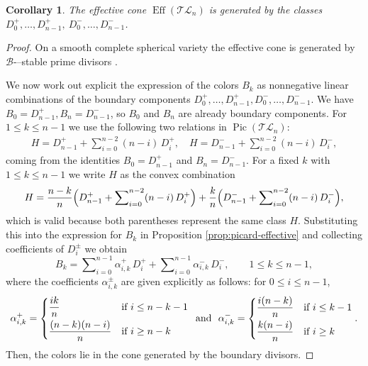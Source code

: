 \documentclass[10pt]{amsart}
\newtheorem{corollary}[theorem]{Corollary}
\theoremstyle{definition}
\newcommand{\Pic}{\operatorname{Pic}}
\newcommand{\Eff}{\operatorname{Eff}}
\newcommand{\TL}{\mathcal{TL}}
\theoremstyle{plain} %
\begin{document}
\begin{corollary}\label{effcone}
The effective cone $\Eff(\TL_n)$ is generated by the classes $D_0^+,\dots,D_{n-1}^+,\ D_0^-,\dots,D_{n-1}^-$.
\end{corollary}
\begin{proof}
On a smooth complete spherical variety the effective cone is generated by
$\mathscr{B}$-–stable prime divisors \cite[Section 2.6]{Br2}. 


We now work out explicit the expression of the colors $B_k$ as nonnegative
linear combinations of the boundary components $D_0^+,\dots,D_{n-1}^+, D_0^-,\dots,D_{n-1}^-$.
We have $B_0=D_{n-1}^+, B_n=D_{n-1}^-$, so $B_0$ and $B_n$ are already boundary components. For
$1\le k\le n-1$ we use the following two relations in $\Pic(\TL_n)$:
\begin{align*}
H=D_{n-1}^+ + \sum\nolimits_{i=0}^{n-2}(n-i)\,D_i^+,\quad
H=D_{n-1}^- + \sum\nolimits_{i=0}^{n-2}(n-i)\,D_i^-,
\end{align*}
coming from the identities $B_0=D_{n-1}^+$ and $B_n=D_{n-1}^-$. For a fixed $k$ with $1\le k\le n-1$ we write $H$ as the convex
combination
\[
H=\frac{n-k}{n}
   \Bigl(D_{n-1}^+ + \sum\nolimits_{i=0}^{n-2}(n-i)\,D_i^+\Bigr)
 + \frac{k}{n}
   \Bigl(D_{n-1}^- + \sum\nolimits_{i=0}^{n-2}(n-i)\,D_i^-\Bigr),
\]
which is valid because both parentheses represent the same class $H$. Substituting this into the expression for $B_k$ in Proposition \ref{prop:picard-effective} and collecting
coefficients of $D_i^\pm$ we obtain
\begin{equation*}%
B_k=
\sum\nolimits_{i=0}^{n-1}\alpha_{i,k}^+\,D_i^+
+
\sum\nolimits_{i=0}^{n-1}\alpha_{i,k}^-\,D_i^-,
\qquad 1\le k\le n-1,
\end{equation*}
where the coefficients $\alpha_{i,k}^\pm$ are given explicitly as follows: for $0\le i\le n-1$,
\[
\alpha_{i,k}^+
 =
\begin{cases}
\dfrac{ik}{n} & \text{if } i\le n-k-1\\[6pt]
\dfrac{(n-k)(n-i)}{n} & \text{if } i\ge n-k
\end{cases}\,\,\,{\rm and}\,\,\,\,
\alpha_{i,k}^-
 =
\begin{cases}
\dfrac{i(n-k)}{n} & \text{if } i\le k-1\\[6pt]
\dfrac{k(n-i)}{n} & \text{if } i\ge k
\end{cases}.
\]
Then, the colors lie in the cone generated by the boundary divisors.
\end{proof}
\end{document}
